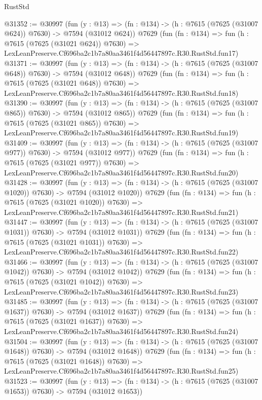 \begin{lexlean}{RustStd}
\begin{coremodule}
@31352 := @30997
    (fun (y : @13) => (fn : @134) -> (h : @7615 (@7625 (@31007 @624)) @7630) -> @7594 (@31012 @624))
    @7629
    (fun (fn : @134) =>
    fun (h : @7615 (@7625 (@31021 @624)) @7630) =>
    LexLeanPreserve.Cf696ba2c1b7a80aa3461f4d56447897c.R30.RustStd.fun17)
@31371 := @30997
    (fun (y : @13) => (fn : @134) -> (h : @7615 (@7625 (@31007 @648)) @7630) -> @7594 (@31012 @648))
    @7629
    (fun (fn : @134) =>
    fun (h : @7615 (@7625 (@31021 @648)) @7630) =>
    LexLeanPreserve.Cf696ba2c1b7a80aa3461f4d56447897c.R30.RustStd.fun18)
@31390 := @30997
    (fun (y : @13) => (fn : @134) -> (h : @7615 (@7625 (@31007 @865)) @7630) -> @7594 (@31012 @865))
    @7629
    (fun (fn : @134) =>
    fun (h : @7615 (@7625 (@31021 @865)) @7630) =>
    LexLeanPreserve.Cf696ba2c1b7a80aa3461f4d56447897c.R30.RustStd.fun19)
@31409 := @30997
    (fun (y : @13) => (fn : @134) -> (h : @7615 (@7625 (@31007 @977)) @7630) -> @7594 (@31012 @977))
    @7629
    (fun (fn : @134) =>
    fun (h : @7615 (@7625 (@31021 @977)) @7630) =>
    LexLeanPreserve.Cf696ba2c1b7a80aa3461f4d56447897c.R30.RustStd.fun20)
@31428 := @30997
    (fun (y : @13) =>
    (fn : @134) -> (h : @7615 (@7625 (@31007 @1020)) @7630) -> @7594 (@31012 @1020))
    @7629
    (fun (fn : @134) =>
    fun (h : @7615 (@7625 (@31021 @1020)) @7630) =>
    LexLeanPreserve.Cf696ba2c1b7a80aa3461f4d56447897c.R30.RustStd.fun21)
@31447 := @30997
    (fun (y : @13) =>
    (fn : @134) -> (h : @7615 (@7625 (@31007 @1031)) @7630) -> @7594 (@31012 @1031))
    @7629
    (fun (fn : @134) =>
    fun (h : @7615 (@7625 (@31021 @1031)) @7630) =>
    LexLeanPreserve.Cf696ba2c1b7a80aa3461f4d56447897c.R30.RustStd.fun22)
@31466 := @30997
    (fun (y : @13) =>
    (fn : @134) -> (h : @7615 (@7625 (@31007 @1042)) @7630) -> @7594 (@31012 @1042))
    @7629
    (fun (fn : @134) =>
    fun (h : @7615 (@7625 (@31021 @1042)) @7630) =>
    LexLeanPreserve.Cf696ba2c1b7a80aa3461f4d56447897c.R30.RustStd.fun23)
@31485 := @30997
    (fun (y : @13) =>
    (fn : @134) -> (h : @7615 (@7625 (@31007 @1637)) @7630) -> @7594 (@31012 @1637))
    @7629
    (fun (fn : @134) =>
    fun (h : @7615 (@7625 (@31021 @1637)) @7630) =>
    LexLeanPreserve.Cf696ba2c1b7a80aa3461f4d56447897c.R30.RustStd.fun24)
@31504 := @30997
    (fun (y : @13) =>
    (fn : @134) -> (h : @7615 (@7625 (@31007 @1648)) @7630) -> @7594 (@31012 @1648))
    @7629
    (fun (fn : @134) =>
    fun (h : @7615 (@7625 (@31021 @1648)) @7630) =>
    LexLeanPreserve.Cf696ba2c1b7a80aa3461f4d56447897c.R30.RustStd.fun25)
@31523 := @30997
    (fun (y : @13) =>
    (fn : @134) -> (h : @7615 (@7625 (@31007 @1653)) @7630) -> @7594 (@31012 @1653))

\end{coremodule}
\end{lexlean}
